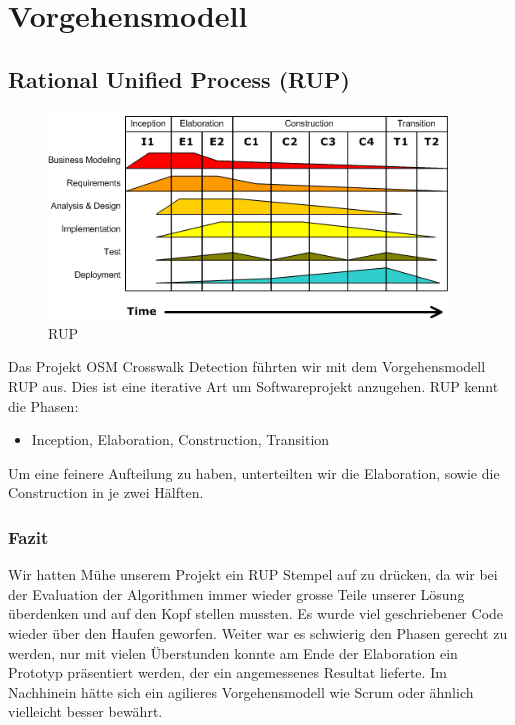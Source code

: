 \section{Vorgehensmodell}
\subsection{Rational Unified Process (RUP)}

\begin{figure}[H]
\centering
\includegraphics[width=300pt]{images/rup.png}
\caption[RUP]{RUP}
\end{figure}

Das Projekt OSM Crosswalk Detection führten wir mit dem Vorgehensmodell RUP \cite{RUP} aus.
Dies ist eine iterative Art um Softwareprojekt anzugehen. RUP kennt die Phasen:

\begin{itemize}
	\item Inception, Elaboration, Construction, Transition
\end{itemize}

Um eine feinere Aufteilung zu haben, unterteilten wir die Elaboration, sowie die Construction in je zwei Hälften. 

\subsubsection{Fazit}
Wir hatten Mühe unserem Projekt ein RUP Stempel auf zu drücken, da wir bei der Evaluation der Algorithmen immer wieder grosse Teile unserer Lösung überdenken und auf den Kopf stellen mussten. Es wurde viel geschriebener Code wieder über den Haufen geworfen. Weiter war es schwierig den Phasen gerecht zu werden, nur mit vielen Überstunden konnte am Ende der Elaboration ein Prototyp präsentiert werden, der ein angemessenes Resultat lieferte. Im Nachhinein hätte sich ein agilieres Vorgehensmodell wie Scrum oder ähnlich vielleicht besser bewährt.
 

